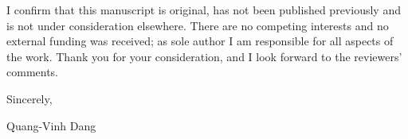 \documentclass[10pt]{article}
\begin{document}
I confirm that this manuscript is original, has not been published previously and
is not under consideration elsewhere. There are no competing interests and no
external funding was received; as sole author I am responsible for all aspects of
the work. Thank you for your consideration, and I look forward to the reviewers'
comments.

\vspace{0.6em}
\noindent Sincerely,

\vspace{0.4em}
\noindent Quang-Vinh Dang
\end{document}
